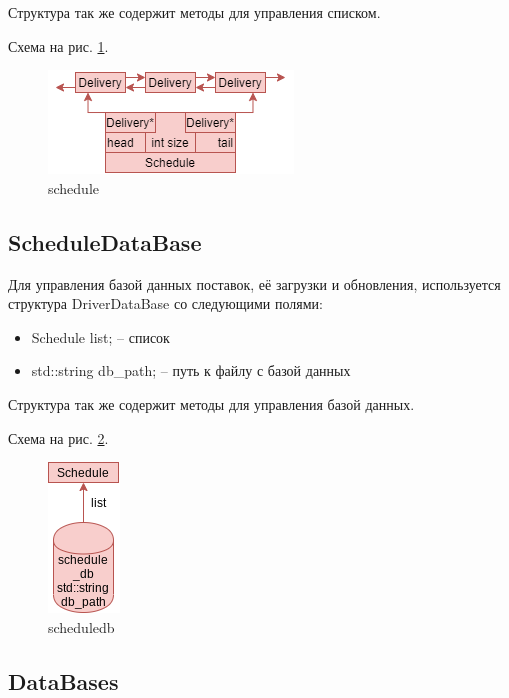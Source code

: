 Структура так же содержит методы для управления списком.

Схема на рис. \ref{schedule}.

\begin{figure}[hpt!]
    \centering
    \includegraphics[width=0.4\linewidth]{photo/data_structures/schedule}
    \caption{schedule}
    \label{schedule}
\end{figure}


\subsection{ScheduleDataBase}

Для управления базой данных поставок, 
её загрузки и обновления, 
используется структура DriverDataBase со следующими полями: 

\begin{itemize}
    \item Schedule list{}; -- список
    \item std::string db\_path{}; -- путь к файлу с базой данных
\end{itemize}

Структура так же содержит методы для управления базой данных.

Схема на рис. \ref{schedule_db}.

\begin{figure}[hpt!]
    \centering
    \includegraphics[width=0.2\linewidth]{photo/data_structures/schedule_db}
    \caption{scheduledb}
    \label{schedule_db}
\end{figure}

\subsection{DataBases}

